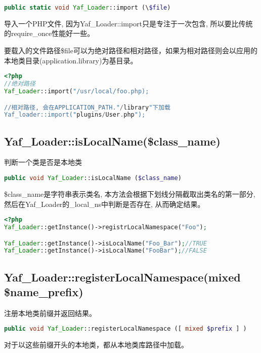 \begin{lstlisting}[language=PHP]
public static void Yaf_Loader::import (\$file)
\end{lstlisting}

导入一个PHP文件, 因为Yaf\_Loader::import只是专注于一次包含, 所以要比传统的require\_once性能好一些。

要载入的文件路径\$file可以为绝对路径和相对路径，如果为相对路径则会以应用的本地类目录(application.library)为基目录。


\begin{lstlisting}[language=PHP]
<?php
//绝对路径
Yaf_Loader::import("/usr/local/foo.php);

//相对路径, 会在APPLICATION_PATH."/library"下加载
Yaf_loader::import("plugins/User.php");
\end{lstlisting}

\subsection{Yaf\_Loader::isLocalName(\$class\_name)}


判断一个类是否是本地类

\begin{lstlisting}[language=PHP]
public void Yaf_Loader::isLocalName ($class_name)
\end{lstlisting}

\$class\_name是字符串表示类名, 本方法会根据下划线分隔截取出类名的第一部分, 然后在Yaf\_Loader的\_local\_ns中判断是否存在, 从而确定结果。

\begin{lstlisting}[language=PHP]
<?php
Yaf_Loader::getInstance()->registrLocalNamespace("Foo");

Yaf_Loader::getInstance()->isLocalName("Foo_Bar");//TRUE
Yaf_Loader::getInstance()->isLocalName("FooBar");//FALSE
\end{lstlisting}

\subsection{Yaf\_Loader::registerLocalNamespace(mixed \$name\_prefix)}

注册本地类前缀并返回结果。

\begin{lstlisting}[language=PHP]
public void Yaf_Loader::registerLocalNamespace ([ mixed $prefix ] )
\end{lstlisting}

对于以这些前缀开头的本地类，都从本地类库路径中加载。

